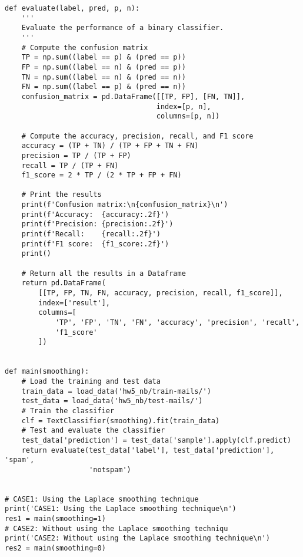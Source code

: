 \begin{solution}
\begin{verbatim}
def evaluate(label, pred, p, n):
    '''
    Evaluate the performance of a binary classifier.
    '''
    # Compute the confusion matrix
    TP = np.sum((label == p) & (pred == p))
    FP = np.sum((label == n) & (pred == p))
    TN = np.sum((label == n) & (pred == n))
    FN = np.sum((label == p) & (pred == n))
    confusion_matrix = pd.DataFrame([[TP, FP], [FN, TN]],
                                    index=[p, n],
                                    columns=[p, n])

    # Compute the accuracy, precision, recall, and F1 score
    accuracy = (TP + TN) / (TP + FP + TN + FN)
    precision = TP / (TP + FP)
    recall = TP / (TP + FN)
    f1_score = 2 * TP / (2 * TP + FP + FN)

    # Print the results
    print(f'Confusion matrix:\n{confusion_matrix}\n')
    print(f'Accuracy:  {accuracy:.2f}')
    print(f'Precision: {precision:.2f}')
    print(f'Recall:    {recall:.2f}')
    print(f'F1 score:  {f1_score:.2f}')
    print()

    # Return all the results in a Dataframe
    return pd.DataFrame(
        [[TP, FP, TN, FN, accuracy, precision, recall, f1_score]],
        index=['result'],
        columns=[
            'TP', 'FP', 'TN', 'FN', 'accuracy', 'precision', 'recall',
            'f1_score'
        ])


def main(smoothing):
    # Load the training and test data
    train_data = load_data('hw5_nb/train-mails/')
    test_data = load_data('hw5_nb/test-mails/')
    # Train the classifier
    clf = TextClassifier(smoothing).fit(train_data)
    # Test and evaluate the classifier
    test_data['prediction'] = test_data['sample'].apply(clf.predict)
    return evaluate(test_data['label'], test_data['prediction'], 'spam',
                    'notspam')


# CASE1: Using the Laplace smoothing technique
print('CASE1: Using the Laplace smoothing technique\n')
res1 = main(smoothing=1)
# CASE2: Without using the Laplace smoothing techniqu
print('CASE2: Without using the Laplace smoothing technique\n')
res2 = main(smoothing=0)


\end{verbatim}
\end{solution}
